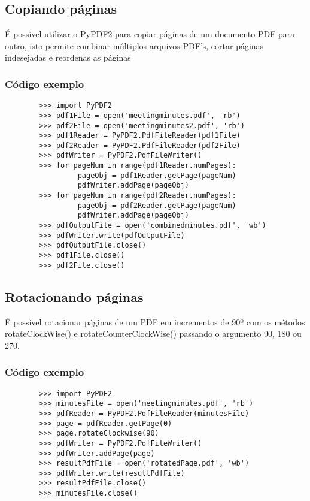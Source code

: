 \documentclass[12pt,a4paper,article]{report}
\begin{document}
    
\subsection{Copiando páginas}
    É possível utilizar o PyPDF2 para copiar páginas de um documento PDF para outro, isto permite combinar múltiplos arquivos PDF's, cortar páginas indesejadas e reordenas as páginas
    
\subsubsection{Código exemplo}
    \begin{verbatim}
        >>> import PyPDF2 
        >>> pdf1File = open('meetingminutes.pdf', 'rb') 
        >>> pdf2File = open('meetingminutes2.pdf', 'rb') 
        >>> pdf1Reader = PyPDF2.PdfFileReader(pdf1File) 
        >>> pdf2Reader = PyPDF2.PdfFileReader(pdf2File) 
        >>> pdfWriter = PyPDF2.PdfFileWriter()
        >>> for pageNum in range(pdf1Reader.numPages):
                 pageObj = pdf1Reader.getPage(pageNum)
                 pdfWriter.addPage(pageObj)
        >>> for pageNum in range(pdf2Reader.numPages):
                 pageObj = pdf2Reader.getPage(pageNum) 
                 pdfWriter.addPage(pageObj)
        >>> pdfOutputFile = open('combinedminutes.pdf', 'wb') 
        >>> pdfWriter.write(pdfOutputFile) 
        >>> pdfOutputFile.close() 
        >>> pdf1File.close() 
        >>> pdf2File.close()
    \end{verbatim}
    
\subsection{Rotacionando páginas}
    É possível rotacionar páginas de um PDF em incrementos de 90º com os métodos rotateClockWise() e rotateCounterClockWise() passando o argumento 90, 180 ou 270.
    
\subsubsection{Código exemplo}
    \begin{verbatim}
        >>> import PyPDF2 
        >>> minutesFile = open('meetingminutes.pdf', 'rb') 
        >>> pdfReader = PyPDF2.PdfFileReader(minutesFile) 
        >>> page = pdfReader.getPage(0) 
        >>> page.rotateClockwise(90) 
        >>> pdfWriter = PyPDF2.PdfFileWriter() 
        >>> pdfWriter.addPage(page) 
        >>> resultPdfFile = open('rotatedPage.pdf', 'wb') 
        >>> pdfWriter.write(resultPdfFile) 
        >>> resultPdfFile.close() 
        >>> minutesFile.close()
    \end{verbatim}
    
\end{document}
